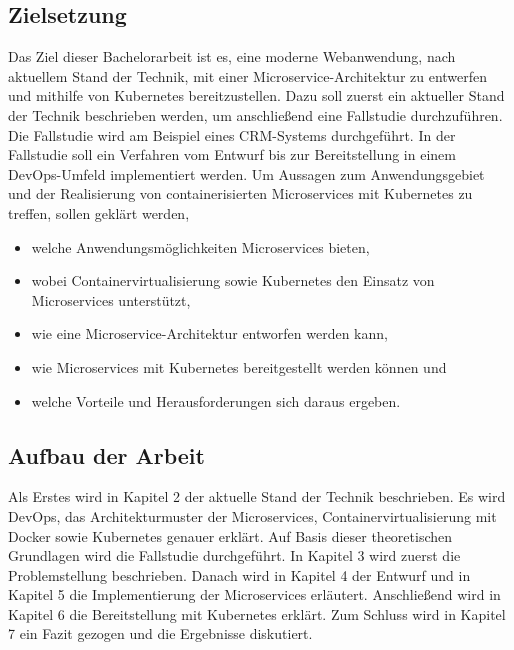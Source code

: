 \subsection{Zielsetzung}
Das Ziel dieser Bachelorarbeit ist es, eine moderne Webanwendung, nach aktuellem Stand der Technik, mit einer Microservice-Architektur zu entwerfen und mithilfe von Kubernetes bereitzustellen. Dazu soll zuerst ein aktueller Stand der Technik beschrieben werden, um anschließend eine Fallstudie durchzuführen. Die Fallstudie wird am Beispiel eines \acp{CRM-System} durchgeführt. In der Fallstudie soll ein Verfahren vom Entwurf bis zur Bereitstellung in einem DevOps-Umfeld implementiert werden. Um Aussagen zum Anwendungsgebiet und der Realisierung von containerisierten Microservices mit Kubernetes zu treffen, sollen geklärt werden, 

\begin{itemize}
\item welche Anwendungsmöglichkeiten Microservices bieten,
\item wobei Containervirtualisierung sowie Kubernetes den Einsatz von Microservices unterstützt,
\item wie eine Microservice-Architektur entworfen werden kann,
\item wie Microservices mit Kubernetes bereitgestellt werden können und
\item welche Vorteile und Herausforderungen sich daraus ergeben.
\end{itemize}

\subsection{Aufbau der Arbeit}

Als Erstes wird in Kapitel 2 der aktuelle Stand der Technik beschrieben. Es wird DevOps, das Architekturmuster der Microservices, Containervirtualisierung mit Docker sowie Kubernetes genauer erklärt. Auf Basis dieser theoretischen Grundlagen wird die Fallstudie durchgeführt. In Kapitel 3 wird zuerst die Problemstellung beschrieben. Danach wird in Kapitel 4 der Entwurf und in Kapitel 5 die Implementierung der Microservices erläutert. Anschließend wird in Kapitel 6 die Bereitstellung mit Kubernetes erklärt. Zum Schluss wird in Kapitel 7 ein Fazit gezogen und die Ergebnisse diskutiert.


